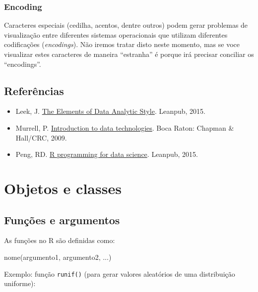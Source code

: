 \documentclass[
  10pt,
  a4paper]{book}
\newenvironment{Shaded}{\begin{snugshade}}{\end{snugshade}}
\newcommand{\FunctionTok}[1]{\textcolor[rgb]{0.00,0.00,0.00}{#1}}
\newcommand{\NormalTok}[1]{#1}
\providecommand{\tightlist}{%
  \setlength{\itemsep}{0pt}\setlength{\parskip}{0pt}}
\begin{document}
\hypertarget{encoding}{%
\subsection{Encoding}\label{encoding}}

Caracteres especiais (cedilha, acentos, dentre outros) podem gerar problemas de visualização
entre diferentes sistemas operacionais que utilizam diferentes codificações (\emph{encodings}).
Não iremos tratar disto neste momento, mas se voce visualizar estes caracteres de maneira ``estranha'' é porque
irá precisar conciliar os ``encodings''.

\hypertarget{referuxeancias}{%
\section*{Referências}\label{referuxeancias}}


\begin{itemize}
\tightlist
\item
  Leek, J. \href{https://leanpub.com/datastyle}{The Elements of Data Analytic Style}. Leanpub, 2015.
\item
  Murrell,
  P. \href{https://www.stat.auckland.ac.nz/~paul/ItDT/HTML}{Introduction to data technologies}. Boca
  Raton: Chapman \& Hall/CRC, 2009.
\item
  Peng,
  RD. \href{https://leanpub.com/rprogramming}{R programming for data science}. Leanpub, 2015.
\end{itemize}

\hypertarget{objetos-e-classes}{%
\chapter{Objetos e classes}\label{objetos-e-classes}}

\hypertarget{funuxe7uxf5es-e-argumentos}{%
\section{Funções e argumentos}\label{funuxe7uxf5es-e-argumentos}}

As funções no R são definidas como:

\begin{Shaded}
\begin{Highlighting}[]
\FunctionTok{nome}\NormalTok{(argumento1, argumento2, ...)}
\end{Highlighting}
\end{Shaded}

Exemplo: função \texttt{runif()} (para gerar valores aleatórios de uma
distribuição uniforme):
\end{document}

